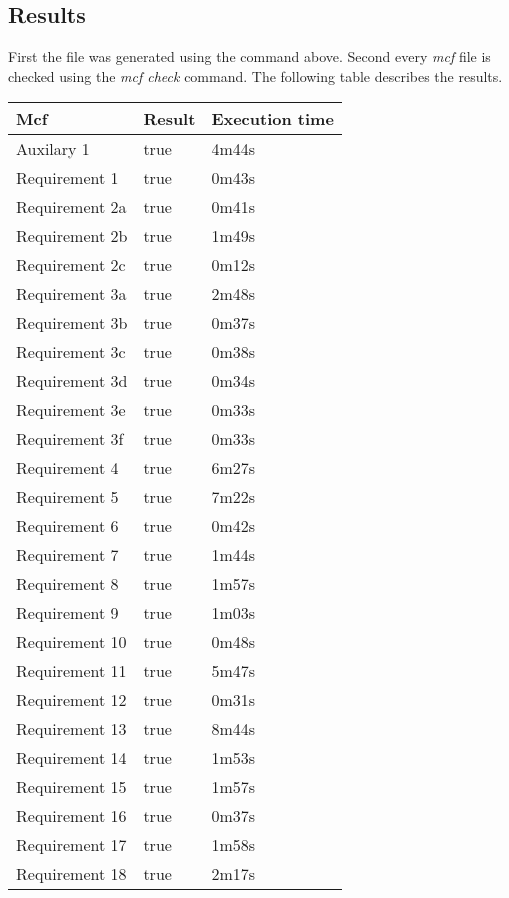 \subsection{Results}
First the  file was generated using the  command above. Second every \textit{mcf} file is checked using the \textit{mcf check} command. The following table describes the results.
\begin{table}[h]
\label{my-label}
\begin{tabular}{|l|l|l|}
\hline
\textbf{Mcf} & \textbf{Result} & \textbf{Execution time} \\ \hline
Auxilary 1 & true & 4m44s \\ \hline
Requirement 1 & true & 0m43s \\ \hline
Requirement 2a & true & 0m41s \\ \hline
Requirement 2b & true & 1m49s \\ \hline
Requirement 2c & true & 0m12s \\ \hline
Requirement 3a & true & 2m48s \\ \hline
Requirement 3b & true & 0m37s \\ \hline
Requirement 3c & true & 0m38s \\ \hline
Requirement 3d & true & 0m34s \\ \hline
Requirement 3e & true & 0m33s \\ \hline
Requirement 3f & true & 0m33s \\ \hline
Requirement 4 & true & 6m27s \\ \hline
Requirement 5 & true & 7m22s \\ \hline
Requirement 6 & true & 0m42s \\ \hline
Requirement 7 & true & 1m44s \\ \hline
Requirement 8 & true & 1m57s \\ \hline
Requirement 9 & true & 1m03s \\ \hline
Requirement 10 & true & 0m48s \\ \hline
Requirement 11 & true & 5m47s \\ \hline
Requirement 12 & true & 0m31s \\ \hline
Requirement 13 & true & 8m44s \\ \hline
Requirement 14 & true & 1m53s \\ \hline
Requirement 15 & true & 1m57s \\ \hline
Requirement 16 & true & 0m37s \\ \hline
Requirement 17 & true & 1m58s \\ \hline
Requirement 18 & true & 2m17s \\ \hline
\end{tabular}
\end{table}